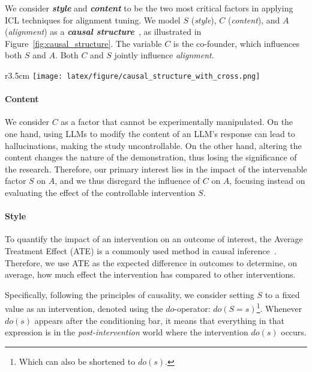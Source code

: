 We consider \textit{\textbf{style}} and \textit{\textbf{content}} to be the two most critical factors in applying ICL techniques for alignment tuning. 
We model $S$ (\textit{style}), $C$ (\textit{content}), and $A$ (\textit{alignment}) as a \textit{\textbf{causal structure}}~\citep{pearl2009causality}, as illustrated in Figure~\ref{fig:causal_structure}. 
The variable $C$ is the co-founder, which influences both $S$ and $A$. Both $C$ and $S$ jointly influence \textit{alignment}.

\begin{wrapfigure}{r}{3.5cm}
    \centering
    \vspace{-17pt}
    \texttt{[image: latex/figure/causal\_structure\_with\_cross.png]}
    \caption{The causal structure of style, content, and alignment.}
    \vspace{-10pt}
    \label{fig:causal_structure}
\end{wrapfigure}

\paragraph{Content}
We consider $C$ as a factor that cannot be experimentally manipulated. 
On the one hand, using LLMs to modify the content of an LLM’s response can lead to hallucinations, making the study uncontrollable. 
On the other hand, altering the content changes the nature of the demonstration, thus losing the significance of the research. 
Therefore, our primary interest lies in the impact of the intervenable factor $S$ on $A$, and we thus disregard the influence of $C$ on $A$, focusing instead on evaluating the effect of the controllable intervention $S$.

\paragraph{Style}
To quantify the impact of an intervention on an outcome of interest, the Average Treatment Effect (ATE) is a commonly used method in causal inference~\citep{kaddour2021causal,DBLP:conf/iclr/MahajanMNS24}.
Therefore, we use ATE as the expected difference in outcomes to determine, on average, how much effect the intervention has compared to other interventions.

Specifically, following the principles of causality, we consider setting $S$ to a fixed value as an intervention, denoted using the $do$-operator: $do(S=s)$\footnote{Which can also be shortened to $do(s)$.}.
Whenever $do(s)$ appears after the conditioning bar, it means that everything in that expression is in the \textit{post-intervention} world where the intervention $do(s)$ occurs.

